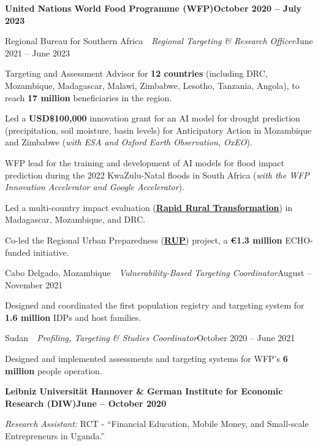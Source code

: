 \documentclass[10pt]{article}
\newcommand{\link}[2]{\href{#1}{\textcolor{cvloc}{\textbf{\underline{#2}}}}}
\newcommand{\dt}[1]{\textcolor{cvgrey}{#1}}                    %
\newcommand{\orgnamefmt}{\fontsize{11}{13}\selectfont\bfseries} %
\newcommand{\orgline}[2]{{\orgnamefmt #1}\hfill\textbf{\dt{#2}}\par} %
\newcommand{\posline}[2]{#1\hfill\dt{#2}\par}                  %
\newcommand{\gap}{\vspace{6.5pt}}
\newcommand{\pipe}{~\textbar~}
\newcommand{\rolelabel}[1]{\textit{#1}}  %
\newcommand{\roleline}[1]{{\noindent\ignorespaces#1\par}} %
\newcommand{\loc}[1]{\textcolor{cvlink}{#1}} %
\begin{document}
\gap
\orgline{United Nations World Food Programme (WFP)}{October 2020 -- July 2023}
\posline{\loc{Regional Bureau for Southern Africa}\pipe\rolelabel{Regional Targeting \& Research Officer}}{June 2021 -- June 2023}
\begin{dashlist}
  \item Targeting and Assessment Advisor for \textbf{12 countries} (including DRC, Mozambique, Madagascar, Malawi, Zimbabwe, Lesotho, Tanzania, Angola), to reach \textbf{17 million} beneficiaries in the region.
  \item Led a \textbf{USD\$100,000} innovation grant for an AI model for drought prediction (precipitation, soil moisture, basin levels) for Anticipatory Action in Mozambique and Zimbabwe (\textit{with ESA and Oxford Earth Observation, OxEO}).
  \item WFP lead for the training and development of AI models for flood impact prediction during the 2022 KwaZulu-Natal floods in South Africa (\textit{with the WFP Innovation Accelerator and Google Accelerator}).
  \item Led a multi-country impact evaluation (\link{https://www.wfp.org/publications/scaling-rapid-rural-transformation-rrt-initiative-madagascar}{Rapid Rural Transformation}) in Madagascar, Mozambique, and DRC.
  \item Co-led the Regional Urban Preparedness (\link{https://www.wfp.org/publications/wfps-regional-urban-preparedness-initiative-response-climate-and-food-security-crises}{RUP}) project, a \textbf{\euro{}1.3 million} ECHO-funded initiative.
\end{dashlist}
\posline{\loc{Cabo Delgado, Mozambique}\pipe\rolelabel{Vulnerability-Based Targeting Coordinator}}{August -- November 2021}
\begin{dashlist}
  \item Designed and coordinated the first population registry and targeting system for \textbf{1.6 million} IDPs and host families.
\end{dashlist}
\posline{\loc{Sudan}\pipe\rolelabel{Profiling, Targeting \& Studies Coordinator}}{October 2020 -- June 2021}
\begin{dashlist}
  \item Designed and implemented assessments and targeting systems for WFP's \textbf{6 million} people operation.
\end{dashlist}
\gap
\orgline{Leibniz Universität Hannover \& German Institute for Economic Research (DIW)}{June -- October 2020}
\roleline{\rolelabel{Research Assistant:} RCT - ``Financial Education, Mobile Money, and Small-scale Entrepreneurs in Uganda.''}
\end{document}
